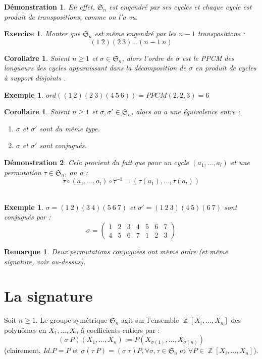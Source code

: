 \documentclass[a4paper, oneside]{report}
\theoremstyle{break}
\newtheorem{cor}[thm]{Corollaire}
\newtheorem{exem}[thm]{Exemple}
\newtheorem{exo}[thm]{Exercice}
\newtheorem{remar}[thm]{Remarque}
\newtheorem*{demo}{Démonstration}
\newcommand{\pcsd}{produit de cycles à support disjoints }
\DeclareMathOperator{\Z}{\mathbb{Z}}
\renewcommand{\S}{\mathfrak{S}}
\begin{document}
\begin{demo}
	En effet, $\S_n$ est engendré par ses cycles et chaque cycle est produit de transpositions, comme on l'a vu.
\end{demo}

\begin{exo}
	Monter que $\S_n$ est même engendré par les $n-1$ transpositions :
	$$(1~2)(2~3)...(n-1~n)$$
\end{exo}

\begin{cor}
	Soient $n\geq 1$ et $\sigma\in \S_n$, alors l'ordre de $\sigma$ est le PPCM des longueurs des cycles apparaissant dans la décomposition de $\sigma$ en \pcsd.
\end{cor}

\begin{exem}
	$ord((1~2)(2~3)(4~5~6)) = PPCM(2,2,3)=6$
\end{exem}

\begin{cor}
	Soient $n\geq 1$ et $\sigma, \sigma ' \in \S_n$, alors on a une équivalence entre :
	\begin{enumerate}
		\item $\sigma$ et $\sigma '$ sont du même type.
		\item $\sigma$ et $\sigma '$ sont conjugués.
	\end{enumerate}
\end{cor}

\begin{demo}
	Cela provient du fait que pour un cycle $(a_1,...,a_l)$ et une permutation $\tau\in \S_n$, on a :
	$$\tau \circ (a_1,...,a_l) \circ \tau^{-1}=(\tau(a_1),...,\tau(a_l))$$
~
\end{demo}

\begin{exem}
	$\sigma = (1~2)(3~4)(5~6~7)$ et $\sigma '=(1~2~3)(4~5)(6~7)$ sont conjugués par :
	$$\sigma = \left(\begin{array}{lllllll}
	1&2&3&4&5&6&7\\
	4&5&6&7&1&2&3
	\end{array}\right)$$
\end{exem}

\begin{remar}
	Deux permutations conjuguées ont même ordre (et même signature, voir au-dessus).
\end{remar}

\section{La signature}
Soit $n\geq 1$. Le groupe symétrique $\S_n$ agit sur l'ensemble $\Z[X_i,...,X_n]$ des polynômes en $X_1,...,X_n$ à coefficients entiers par :
$$(\sigma~P)(X_1,...,X_n):= P(X_{\sigma(1)},...,X_{\sigma(n)})$$
(clairement, $Id.P=P$ et $\sigma(\tau~P)=(\sigma~\tau)P, \forall \sigma,\tau \in \S_n$ et $\forall P\in \Z[X_i,...,X_n]$).\\
\end{document}

